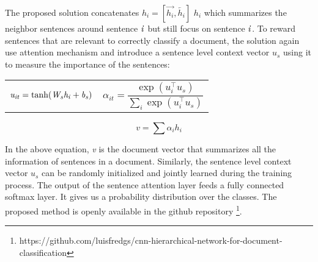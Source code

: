 \documentclass[runningheads]{llncs}
\begin{document}
\vspace{-4mm} 

The proposed solution concatenates $h_i = [\overrightarrow{h_i}, \overleftarrow{h_i}]$ $h_i$ which summarizes the neighbor sentences around sentence $\it{i}$ but still focus on sentence $\it{i}$. To reward sentences that are relevant to correctly classify a document, the solution again use attention mechanism and introduce a sentence level context vector $u_s$ using it to measure the importance of the sentences: \\[-7mm]



 
\noindent
\begin{tabularx}{\linewidth}{XX}
    \begin{equation}
      \it{u_{it}} = \tanh(\it{W_sh_{i}} + \it{b_s})
    \end{equation}
    &
    \begin{equation}
     \alpha_{it} = \dfrac{\exp(u_{i}^ \top u_s)}{\sum_i \exp(u_{i}^ \top u_s)} 
    \end{equation}
    
\end{tabularx}

\vspace{-5mm}

 \begin{equation}
     v = \sum \alpha_{i} h_{i}
 \end{equation}

\vspace{-1mm}

In the above equation, \textit{v} is the document vector that summarizes all the information of sentences in a document. Similarly, the sentence level context vector $u_s$ can be randomly initialized and jointly learned during the training process. The output of the sentence attention layer feeds a fully connected softmax layer. It gives us a probability distribution over the classes. The proposed method is openly available in the github repository \footnote{https://github.com/luisfredgs/cnn-hierarchical-network-for-document-classification}.\\[-8mm]
\end{document}

